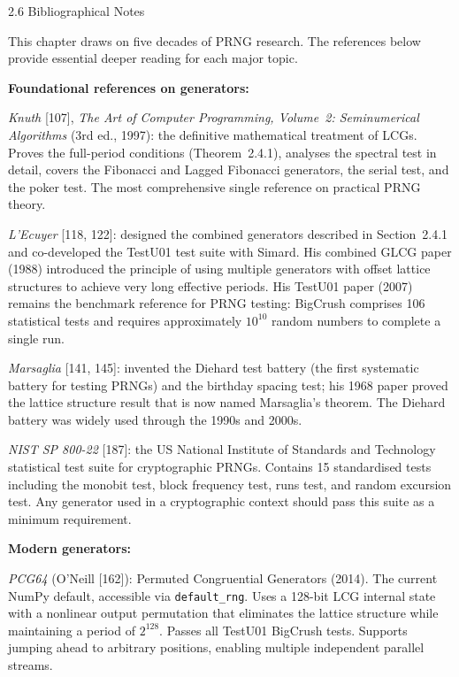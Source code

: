 \documentclass[aspectratio=169,10pt]{beamer}
\begin{document}
\begin{frame}[allowframebreaks]{2.6 Bibliographical Notes}

This chapter draws on five decades of PRNG research.  The references below
provide essential deeper reading for each major topic.

\medskip
\textbf{Foundational references on generators:}

\emph{Knuth} [107], \emph{The Art of Computer Programming, Volume~2:
Seminumerical Algorithms} (3rd ed., 1997): the definitive mathematical
treatment of LCGs.  Proves the full-period conditions (Theorem~2.4.1),
analyses the spectral test in detail, covers the Fibonacci and Lagged
Fibonacci generators, the serial test, and the poker test.  The most
comprehensive single reference on practical PRNG theory.

\emph{L'Ecuyer} [118, 122]: designed the combined generators described in
Section~2.4.1 and co-developed the TestU01 test suite with Simard.  His
combined GLCG paper (1988) introduced the principle of using multiple
generators with offset lattice structures to achieve very long effective
periods.  His TestU01 paper (2007) remains the benchmark reference for
PRNG testing: BigCrush comprises 106 statistical tests and requires
approximately $10^{10}$ random numbers to complete a single run.

\emph{Marsaglia} [141, 145]: invented the Diehard test battery (the first
systematic battery for testing PRNGs) and the birthday spacing test; his
1968 paper proved the lattice structure result that is now named Marsaglia's
theorem.  The Diehard battery was widely used through the 1990s and 2000s.

\emph{NIST SP 800-22} [187]: the US National Institute of Standards and
Technology statistical test suite for cryptographic PRNGs.  Contains 15
standardised tests including the monobit test, block frequency test, runs
test, and random excursion test.  Any generator used in a cryptographic
context should pass this suite as a minimum requirement.

\framebreak

\textbf{Modern generators:}

\emph{PCG64} (O'Neill [162]): Permuted Congruential Generators (2014).
The current NumPy default, accessible via \texttt{default\_rng}.  Uses a
128-bit LCG internal state with a nonlinear output permutation that
eliminates the lattice structure while maintaining a period of $2^{128}$.
Passes all TestU01 BigCrush tests.  Supports jumping ahead to arbitrary
positions, enabling multiple independent parallel streams.


\end{frame}
\end{document}
